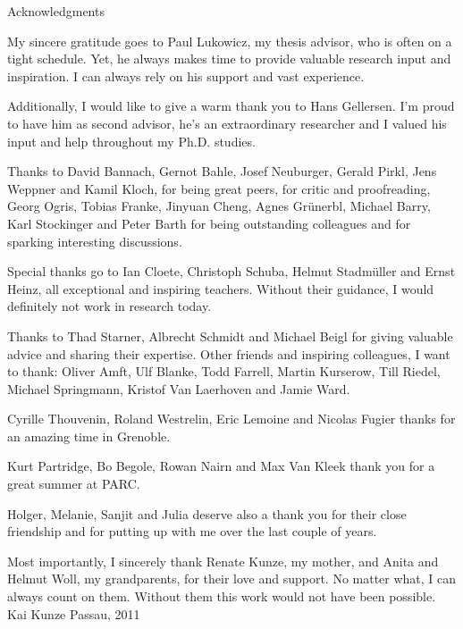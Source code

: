 \begin{flushleft}
\medskip
\Large\textrm{Acknowledgments}
\medskip
\end{flushleft}
My sincere gratitude goes to Paul Lukowicz, my thesis advisor,
who is often on a tight schedule. Yet, he always makes time to provide valuable research input and inspiration.
I can always rely on his support and vast experience.

Additionally, I would like to give a warm thank you to Hans Gellersen. I'm proud to have him as second advisor, he's an extraordinary researcher and I valued his input and help throughout my Ph.D. studies.

Thanks to David Bannach, Gernot Bahle, Josef Neuburger, Gerald Pirkl, Jens Weppner and Kamil Kloch, for being great peers, for critic and proofreading, Georg Ogris, Tobias Franke, Jinyuan Cheng, Agnes Gr\"unerbl,  Michael Barry, Karl Stockinger and Peter Barth for being outstanding colleagues and for sparking interesting discussions.

Special thanks go to Ian Cloete, Christoph Schuba, Helmut Stadm\"uller and Ernst Heinz, all exceptional and inspiring teachers. Without their guidance, I would definitely not work in research today.

Thanks to Thad Starner, Albrecht Schmidt and Michael Beigl for giving valuable advice and sharing their expertise.
Other friends and inspiring colleagues, I want to thank: Oliver Amft, Ulf Blanke, Todd Farrell, Martin Kurserow, Till Riedel, Michael Springmann, Kristof Van Laerhoven and Jamie Ward.

Cyrille Thouvenin, Roland Westrelin, Eric Lemoine and Nicolas Fugier  thanks for an amazing time in Grenoble.

Kurt Partridge, Bo Begole, Rowan Nairn and Max Van Kleek thank you for a great summer at PARC.

Holger, Melanie, Sanjit and Julia deserve also a thank you for their close friendship and for putting up with me over the last couple of years.

Most importantly, I sincerely thank Renate Kunze, my mother, and Anita and Helmut Woll, my grandparents, 
for their love and support. No matter what, I can always count on them. Without them this work would not have been possible.
\newline
\newline
\newline
\newline
\newline
\noindent Kai Kunze \newline
\noindent Passau, 2011
